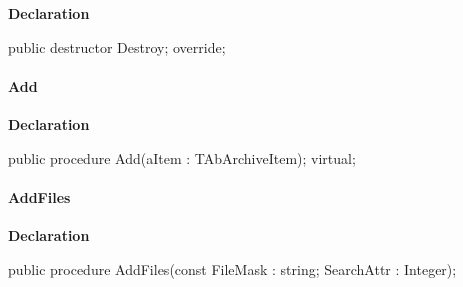 \documentclass{report}
\newif\ifpdf
\begin{document}
\label{AbArcTyp.TAbArchive-Destroy}
\begin{list}{}{
\setlength{\itemindent}{0cm}
\setlength{\listparindent}{0cm}
\setlength{\leftmargin}{\evensidemargin}
\addtolength{\leftmargin}{\tmplength}
\settowidth{\labelsep}{X}
\addtolength{\leftmargin}{\labelsep}
\setlength{\labelwidth}{\tmplength}
}
\item[\textbf{Declaration}\hfill]
\ifpdf
\begin{flushleft}
\fi
\begin{ttfamily}
public destructor Destroy; override;\end{ttfamily}

\ifpdf
\end{flushleft}
\fi

\end{list}
\paragraph*{Add}\hspace*{\fill}

\label{AbArcTyp.TAbArchive-Add}
\begin{list}{}{
\setlength{\itemindent}{0cm}
\setlength{\listparindent}{0cm}
\setlength{\leftmargin}{\evensidemargin}
\addtolength{\leftmargin}{\tmplength}
\settowidth{\labelsep}{X}
\addtolength{\leftmargin}{\labelsep}
\setlength{\labelwidth}{\tmplength}
}
\item[\textbf{Declaration}\hfill]
\ifpdf
\begin{flushleft}
\fi
\begin{ttfamily}
public procedure Add(aItem : TAbArchiveItem); virtual;\end{ttfamily}

\ifpdf
\end{flushleft}
\fi

\end{list}
\paragraph*{AddFiles}\hspace*{\fill}

\label{AbArcTyp.TAbArchive-AddFiles}
\begin{list}{}{
\setlength{\itemindent}{0cm}
\setlength{\listparindent}{0cm}
\setlength{\leftmargin}{\evensidemargin}
\addtolength{\leftmargin}{\tmplength}
\settowidth{\labelsep}{X}
\addtolength{\leftmargin}{\labelsep}
\setlength{\labelwidth}{\tmplength}
}
\item[\textbf{Declaration}\hfill]
\ifpdf
\begin{flushleft}
\fi
\begin{ttfamily}
public procedure AddFiles(const FileMask : string; SearchAttr : Integer);\end{ttfamily}

\ifpdf
\end{flushleft}
\fi

\end{list}
\end{document}
